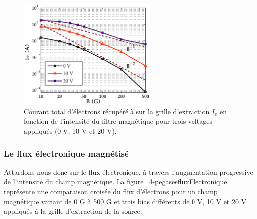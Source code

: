 \begin{refsection}
\begin{figure}[!htbp]
	\centering
	\includegraphics[width=0.6\textwidth]{figures/4-pegasesVarMagCourantParoi.eps}
	{\caption{Courant total d'électrons récupéré à sur la grille d'extraction $I_e$
	en fonction de l'intensité du filtre magnétique pour trois voltages appliqués (0 V, 10 V et 20 V). }
	\label{pegasesVarMagCourantParoi}}
	\end{figure}

\subsubsection{Le flux électronique magnétisé}

Attardons nous donc sur le flux électronique, à travers l'augmentation
progressive de l'intensité du champ magnétique. La
figure~\ref{4-pegasesfluxElectronique} représente une comparaison croisée du
flux d'électrons pour un champ magnétique variant de 0 G à 500 G et trois bias
différents de 0 V, 10 V et 20 V appliqués à la grille d'extraction de la source. 


\end{refsection}
